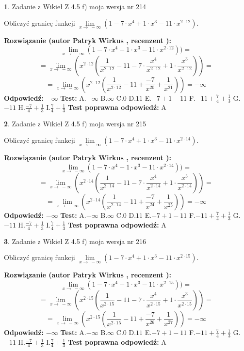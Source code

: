 \documentclass[12pt, a4paper]{article}
\theoremstyle{definition} %
\newtheorem{zad}{}
\newcommand{\zadStart}[1]{\begin{zad}#1\newline}
\newcommand{\zadStop}{\end{zad}}
\newcommand{\rozwStart}[2]{\noindent \textbf{Rozwiązanie (autor #1 , recenzent #2): }\newline}
\newcommand{\rozwStop}{\newline}
\newcommand{\odpStart}{\noindent \textbf{Odpowiedź:}\newline}
\newcommand{\odpStop}{\newline}
\newcommand{\testStart}{\noindent \textbf{Test:}\newline}
\newcommand{\testStop}{\newline}
\newcommand{\kluczStart}{\noindent \textbf{Test poprawna odpowiedź:}\newline}
\newcommand{\kluczStop}{\newline}
\begin{document}
\zadStart{Zadanie z Wikieł Z 4.5 f) moja wersja nr 214}



Obliczyć granicę funkcji  $\lim\limits_{x\to\ -\infty}(1 - 7 \cdot x^{4}+1 \cdot x^{3}- 11 \cdot x^{2\cdot12})$.
\zadStop
\rozwStart{Patryk Wirkus}{}
$$\lim\limits_{x\to\ -\infty}(1 - 7 \cdot x^{4}+1 \cdot x^{3}- 11 \cdot x^{2\cdot12}))=$$
$$=\lim\limits_{x\to\ -\infty}(x^{2\cdot12}(\frac{1}{x^{2\cdot12}}-11 -7 \cdot \frac{x^{4}}{x^{2\cdot12}}+1 \cdot \frac{x^{3}}{x^{2\cdot12}}))=$$
$$=\lim\limits_{x\to\ -\infty}(x^{2\cdot12}(\frac{1}{x^{2\cdot12}}-11 + \frac{-7}{x^{20}}+ \frac{1}{x^{21}}))=-\infty$$
\rozwStop
\odpStart
$-\infty$
\odpStop
\testStart
A.$-\infty$ B.$\infty$ C.$0$ D.$11$ E.$-7 + 1 - 11$
F.$-11+\frac{7}{4}+\frac{1}{3}$ G.$-11$
H.$\frac{-7}{4}+\frac{1}{3}$
I.$\frac{7}{4}+\frac{1}{3}$
\testStop
\kluczStart
A
\kluczStop



\zadStart{Zadanie z Wikieł Z 4.5 f) moja wersja nr 215}



Obliczyć granicę funkcji  $\lim\limits_{x\to\ -\infty}(1 - 7 \cdot x^{4}+1 \cdot x^{3}- 11 \cdot x^{2\cdot14})$.
\zadStop
\rozwStart{Patryk Wirkus}{}
$$\lim\limits_{x\to\ -\infty}(1 - 7 \cdot x^{4}+1 \cdot x^{3}- 11 \cdot x^{2\cdot14}))=$$
$$=\lim\limits_{x\to\ -\infty}(x^{2\cdot14}(\frac{1}{x^{2\cdot14}}-11 -7 \cdot \frac{x^{4}}{x^{2\cdot14}}+1 \cdot \frac{x^{3}}{x^{2\cdot14}}))=$$
$$=\lim\limits_{x\to\ -\infty}(x^{2\cdot14}(\frac{1}{x^{2\cdot14}}-11 + \frac{-7}{x^{24}}+ \frac{1}{x^{25}}))=-\infty$$
\rozwStop
\odpStart
$-\infty$
\odpStop
\testStart
A.$-\infty$ B.$\infty$ C.$0$ D.$11$ E.$-7 + 1 - 11$
F.$-11+\frac{7}{4}+\frac{1}{3}$ G.$-11$
H.$\frac{-7}{4}+\frac{1}{3}$
I.$\frac{7}{4}+\frac{1}{3}$
\testStop
\kluczStart
A
\kluczStop



\zadStart{Zadanie z Wikieł Z 4.5 f) moja wersja nr 216}



Obliczyć granicę funkcji  $\lim\limits_{x\to\ -\infty}(1 - 7 \cdot x^{4}+1 \cdot x^{3}- 11 \cdot x^{2\cdot15})$.
\zadStop
\rozwStart{Patryk Wirkus}{}
$$\lim\limits_{x\to\ -\infty}(1 - 7 \cdot x^{4}+1 \cdot x^{3}- 11 \cdot x^{2\cdot15}))=$$
$$=\lim\limits_{x\to\ -\infty}(x^{2\cdot15}(\frac{1}{x^{2\cdot15}}-11 -7 \cdot \frac{x^{4}}{x^{2\cdot15}}+1 \cdot \frac{x^{3}}{x^{2\cdot15}}))=$$
$$=\lim\limits_{x\to\ -\infty}(x^{2\cdot15}(\frac{1}{x^{2\cdot15}}-11 + \frac{-7}{x^{26}}+ \frac{1}{x^{27}}))=-\infty$$
\rozwStop
\odpStart
$-\infty$
\odpStop
\testStart
A.$-\infty$ B.$\infty$ C.$0$ D.$11$ E.$-7 + 1 - 11$
F.$-11+\frac{7}{4}+\frac{1}{3}$ G.$-11$
H.$\frac{-7}{4}+\frac{1}{3}$
I.$\frac{7}{4}+\frac{1}{3}$
\testStop
\kluczStart
A
\kluczStop
\end{document}
